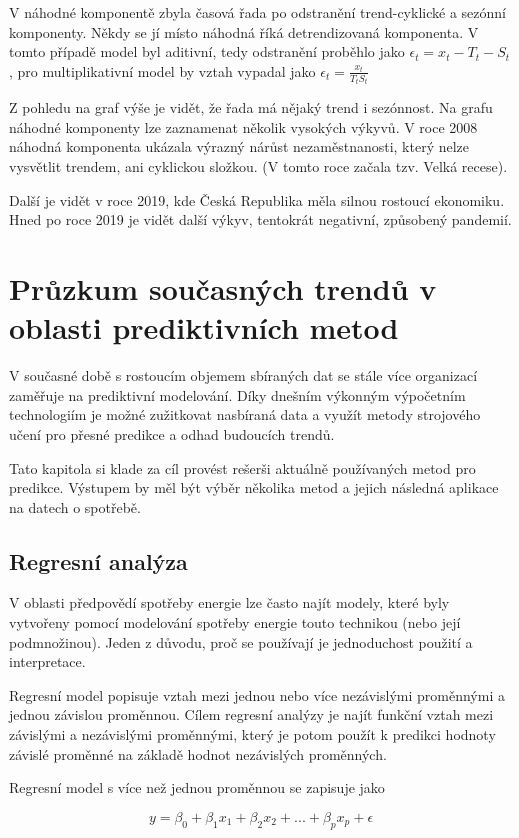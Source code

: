 \documentclass[FM,BP,fonts]{tulthesis}
\begin{document}
V náhodné komponentě zbyla časová řada po odstranění trend-cyklické a sezónní komponenty. Někdy se jí místo náhodná říká detrendizovaná komponenta. V tomto případě model byl aditivní, tedy odstranění proběhlo jako $\epsilon_t = x_t - T_t - S_t$, pro multiplikativní model by vztah vypadal jako $\epsilon_t = \frac{x_t}{T_tS_t}$

Z pohledu na graf výše je vidět, že řada má nějaký trend i sezónnost. Na grafu náhodné komponenty lze zaznamenat několik vysokých výkyvů. V roce 2008 náhodná komponenta ukázala výrazný nárůst nezaměstnanosti, který nelze vysvětlit trendem, ani cyklickou složkou. (V tomto roce začala tzv. Velká recese).

 Další je vidět v roce 2019, kde Česká Republika měla silnou rostoucí ekonomiku. Hned po roce 2019 je vidět další výkyv, tentokrát negativní, způsobený pandemií.

\chapter{Průzkum současných trendů v oblasti prediktivních metod}
V současné době s rostoucím objemem sbíraných dat se stále více organizací zaměřuje na prediktivní modelování. Díky dnešním výkonným výpočetním technologiím je možné zužitkovat nasbíraná data a využít metody strojového učení pro přesné predikce a odhad budoucích trendů.

Tato kapitola si klade za cíl provést rešerši aktuálně používaných metod pro predikce. Výstupem by měl být výběr několika metod a jejich následná aplikace na datech o spotřebě.

\section{Regresní analýza}
V oblasti předpovědí spotřeby energie lze často najít modely, které byly vytvořeny pomocí modelování spotřeby energie touto technikou (nebo její podmnožinou). Jeden z důvodu, proč se používají je jednoduchost použití a interpretace.

Regresní model popisuje vztah mezi jednou nebo více nezávislými proměnnými a jednou závislou proměnnou. Cílem regresní analýzy je najít funkční vztah mezi závislými a nezávislými proměnnými, který je potom použít k predikci hodnoty závislé proměnné na základě hodnot nezávislých proměnných.

Regresní model s více než jednou proměnnou se zapisuje jako

\begin{equation}
	y = \beta_0 + \beta_1x_1 + \beta_2x_2 + ... + \beta_px_p +  \epsilon
\end{equation}
\end{document}

